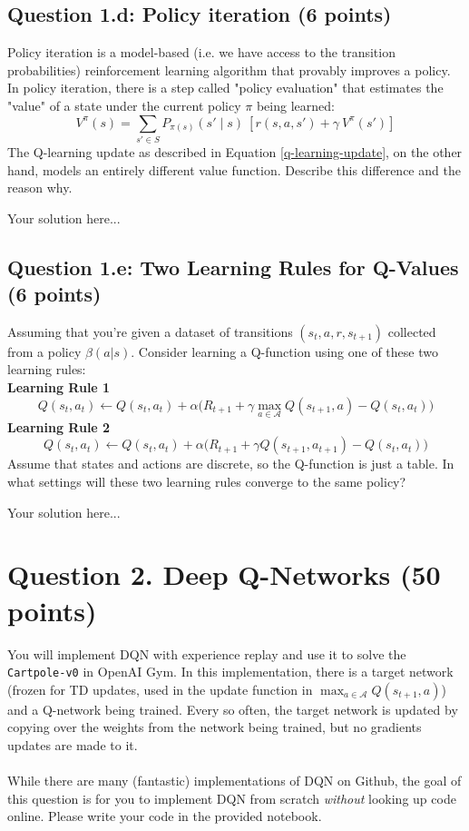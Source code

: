 \documentclass[12pt]{article}
\begin{document}
\subsection*{Question 1.d: Policy iteration (6 points)}
Policy iteration is a model-based (i.e. we have access to the transition probabilities) reinforcement learning algorithm that provably improves a policy. In policy iteration, there is a step called "policy evaluation" that estimates the "value" of a state under the current policy $\pi$ being learned:
$$ V^\pi(s) =  \sum_{s' \in S} P_{\pi(s)} (s' \mid s)\ [r(s,a,s') +  \gamma\ V^\pi(s') ] $$
The Q-learning update as described in Equation \ref{q-learning-update}, on the other hand, models an entirely different value function. Describe this difference and the reason why.

\begin{solution}
Your solution here...
\end{solution}

\subsection*{Question 1.e: Two Learning Rules for Q-Values (6 points)}
Assuming that you're given a dataset of transitions $(s_t, a, r, s_{t+1})$ collected from a policy $\beta(a \vert s)$. Consider learning a Q-function using one of these two learning rules: \\
\textbf{Learning Rule 1}
\begin{equation} 
Q(s_t,a_t) \leftarrow Q(s_t,a_t) + \alpha \biggr( R_{t+1} + \gamma \max_{a \in \mathcal{A}} Q(s_{t+1},a) - Q(s_t,a_t) \biggr)
\end{equation}
\textbf{Learning Rule 2}
\begin{equation} 
Q(s_t,a_t) \leftarrow Q(s_t,a_t) + \alpha \biggr( R_{t+1} + \gamma  Q(s_{t+1},a_{t+1}) - Q(s_t,a_t) \biggr)
\end{equation}
 Assume that states and actions are discrete, so the Q-function is just a table.
In what settings will these two learning rules converge to the same policy?
\begin{solution}
Your solution here...
\end{solution}

\section*{Question 2. Deep Q-Networks (50 points)}
You will implement DQN with experience replay and use it to solve the \texttt{Cartpole-v0} in OpenAI Gym. In this implementation, there is a target network (frozen for TD updates, used in the update function in $\max_{a \in \mathcal{A}} Q(s_{t+1}, a)$) and a Q-network being trained. Every so often, the target network is updated by copying over the weights from the network being trained, but no gradients updates are made to it. 
\\\\
While there are many (fantastic) implementations of DQN on Github, the goal of this question is for you to implement DQN from scratch \textit{without} looking up code online. Please write your code in the provided notebook.
\end{document}
